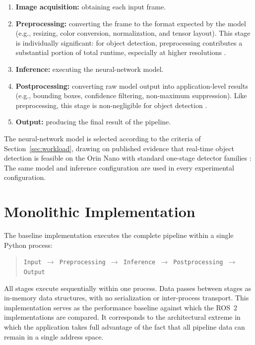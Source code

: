 \begin{enumerate}
  \item \textbf{Image acquisition:} obtaining each input frame.
  \item \textbf{Preprocessing:} converting the frame to the format expected
        by the model (e.g., resizing, color conversion, normalization, and
        tensor layout). This stage is individually significant: for object
        detection, preprocessing contributes a substantial portion of
        total runtime, especially at higher resolutions
        \cite{szegedi2026}.
  \item \textbf{Inference:} executing the neural-network model.
  \item \textbf{Postprocessing:} converting raw model output into
        application-level results (e.g., bounding boxes, confidence
        filtering, non-maximum suppression). Like preprocessing, this
        stage is non-negligible for object detection \cite{szegedi2026}.
  \item \textbf{Output:} producing the final result of the pipeline.
\end{enumerate}

The neural-network model is selected according to the criteria of
Section~\ref{sec:workload}, drawing on published evidence that real-time
object detection is feasible on the Orin Nano with standard one-stage
detector families \cite{scalcon2024, alqahtani2026, szegedi2026,zequn2026}:
 The same model and inference configuration are
used in every experimental configuration.

\section{Monolithic Implementation}
\label{sec:monolithic}

The baseline implementation executes the complete pipeline within a single
Python process:

\begin{quote}
\texttt{Input $\rightarrow$ Preprocessing $\rightarrow$ Inference
$\rightarrow$ Postprocessing $\rightarrow$ Output}
\end{quote}

All stages execute sequentially within one process. Data passes between
stages as in-memory data structures, with no serialization or
inter-process transport. This implementation serves as the performance
baseline against which the ROS~2 implementations are compared. It
corresponds to the architectural extreme in which the application takes
full advantage of the fact that all pipeline data can remain in a single
address space.

